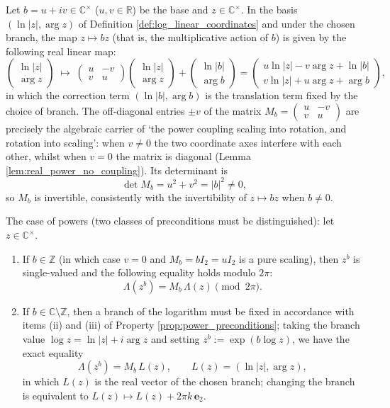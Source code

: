 \begin{theorem}\label{thm:power_matrix_log_coordinates}
Let $b=u+iv\in\mathbb{C}^{\times}$ ($u,v\in\mathbb{R}$) be the base and $z\in\mathbb{C}^{\times}$. In the basis $(\ln|z|,\arg z)$ of Definition \ref{def:log_linear_coordinates} and under the chosen branch, the map $z\mapsto bz$ (that is, the multiplicative action of $b$) is given by the following real linear map:
\[
\begin{pmatrix}\ln|z|\\ \arg z\end{pmatrix}
\;\longmapsto\;
\begin{pmatrix}u&-v\\ v&u\end{pmatrix}
\begin{pmatrix}\ln|z|\\ \arg z\end{pmatrix}
+\begin{pmatrix}\ln|b|\\ \arg b\end{pmatrix}
=\begin{pmatrix}u\ln|z|-v\arg z+\ln|b|\\ v\ln|z|+u\arg z+\arg b\end{pmatrix},
\]
in which the correction term $(\ln|b|,\arg b)$ is the translation term fixed by the choice of branch. The off-diagonal entries $\pm v$ of the matrix $M_b=\begin{pmatrix}u&-v\\ v&u\end{pmatrix}$ are precisely the algebraic carrier of `the power coupling scaling into rotation, and rotation into scaling': when $v\neq0$ the two coordinate axes interfere with each other, whilst when $v=0$ the matrix is diagonal (Lemma \ref{lem:real_power_no_coupling}). Its determinant is
\[
\det M_b=u^2+v^2=|b|^2\neq0,
\]
so $M_b$ is invertible, consistently with the invertibility of $z\mapsto bz$ when $b\neq0$.

The case of powers (two classes of preconditions must be distinguished): let $z\in\mathbb{C}^{\times}$.
\begin{enumerate}[label=(\roman*)]
    \item If $b\in\mathbb{Z}$ (in which case $v=0$ and $M_b=bI_2=uI_2$ is a pure scaling), then $z^b$ is single-valued and the following equality holds modulo $2\pi$:
    \[
    \Lambda(z^b)=M_b\,\Lambda(z)\pmod{2\pi}.
    \]
    \item If $b\in\mathbb{C}\setminus\mathbb{Z}$, then a branch of the logarithm must be fixed in accordance with items (ii) and (iii) of Property \ref{prop:power_preconditions}; taking the branch value $\log z=\ln|z|+i\arg z$ and setting $z^b:=\exp(b\log z)$, we have the exact equality
    \[
    \Lambda(z^b)=M_b\,L(z),\qquad L(z)=(\ln|z|,\arg z),
    \]
    in which $L(z)$ is the real vector of the chosen branch; changing the branch is equivalent to $L(z)\mapsto L(z)+2\pi k\,\mathbf{e}_2$.
\end{enumerate}
\end{theorem}

